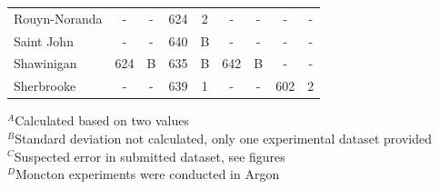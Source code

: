 \documentclass{book}
\begin{document}
\begin{table}[ht]
\begin{center}
\begin{tabular}{|l|cc|cc|cc|cc|}
Rouyn-Noranda           & -           & -               & 624            & 2                & -          & -                 & -           & -                     \\
Saint John              & -           & -               & 640            & B                & -          & -                 & -           & -                     \\
Shawinigan              & 624         & B               & 635            & B                & 642        & B                 & -           & -                     \\
Sherbrooke              & -           & -               & 639            & 1                & -          & -                 & 602         & 2                     \\  \hline
\end{tabular}
\end{center}
$^A$Calculated based on two values \\
$^B$Standard deviation not calculated, only one experimental dataset provided \\
$^C$Suspected error in submitted dataset, see figures \\
$^D$Moncton experiments were conducted in Argon
\end{table}
\end{document}
